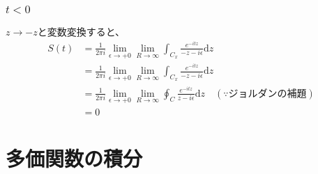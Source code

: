 \documentclass[dvipdfmx,a4paper]{jsarticle}
\begin{document}
 \subsubsection{$t < 0$}
 $z \to -z$と変数変換すると、
 \begin{align*}
 S(t) &= \frac{1}{2\pi i}\lim_{\epsilon \to +0}\lim_{R\to \infty}\int_{C_x}\frac{e^{-itz}}{-z - i\epsilon}\mathrm{d}z\\
 &= \frac{1}{2\pi i}\lim_{\epsilon \to +0}\lim_{R\to \infty}\int_{C_x}\frac{e^{-itz}}{-z - i\epsilon}\mathrm{d}z\\
 &= \frac{1}{2\pi i}\lim_{\epsilon \to +0}\lim_{R\to \infty}\oint_{C}\frac{e^{-itz}}{z - i\epsilon}\mathrm{d}z\quad(\because ジョルダンの補題)\\
 &=  0
 \end{align*}
 
 \section{多価関数の積分}
\end{document}
